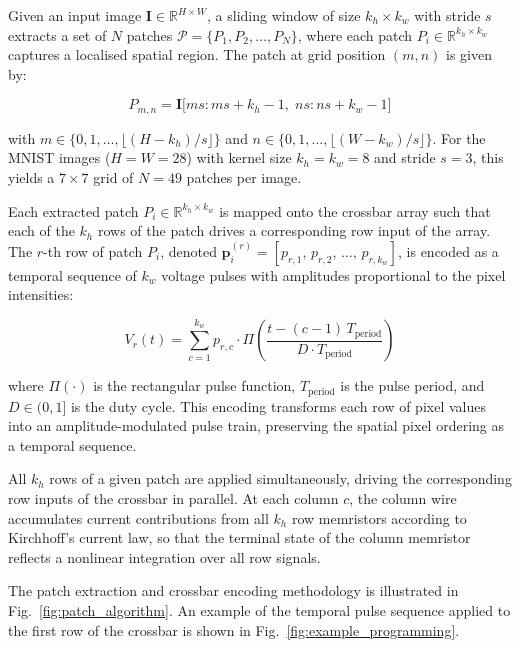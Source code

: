 \documentclass[11pt, oneside]{article}
\begin{document}
Given an input image \(\mathbf{I} \in \mathbb{R}^{H \times W}\), a sliding window of size \(k_h \times k_w\) with stride \(s\) extracts a set of \(N\) patches \(\mathcal{P} = \{P_1, P_2, \ldots, P_N\}\), where each patch \(P_i \in \mathbb{R}^{k_h \times k_w}\) captures a localised spatial region. The patch at grid position \((m, n)\) is given by:

\begin{equation}
    P_{m,n} = \mathbf{I}\bigl[m s : m s + k_h - 1,\; n s : n s + k_w - 1\bigr]
\end{equation}

\noindent with \(m \in \{0, 1, \ldots, \lfloor(H - k_h)/s\rfloor\}\) and \(n \in \{0, 1, \ldots, \lfloor(W - k_w)/s\rfloor\}\). For the MNIST images (\(H = W = 28\)) with kernel size \(k_h = k_w = 8\) and stride \(s = 3\), this yields a \(7 \times 7\) grid of \(N = 49\) patches per image.



Each extracted patch \(P_i \in \mathbb{R}^{k_h \times k_w}\) is mapped onto the crossbar array such that each of the \(k_h\) rows of the patch drives a corresponding row input of the array. The \(r\)-th row of patch \(P_i\), denoted \(\mathbf{p}_i^{(r)} = [p_{r,1},\, p_{r,2},\, \ldots,\, p_{r,k_w}]\), is encoded as a temporal sequence of \(k_w\) voltage pulses with amplitudes proportional to the pixel intensities:

\begin{equation}
    V_r(t) = \sum_{c=1}^{k_w} p_{r,c} \cdot \Pi\!\left(\frac{t - (c-1)\,T_{\mathrm{period}}}{D \cdot T_{\mathrm{period}}}\right)
\end{equation}

\noindent where \(\Pi(\cdot)\) is the rectangular pulse function, \(T_{\mathrm{period}}\) is the pulse period, and \(D \in (0, 1]\) is the duty cycle. This encoding transforms each row of pixel values into an amplitude-modulated pulse train, preserving the spatial pixel ordering as a temporal sequence.

All \(k_h\) rows of a given patch are applied simultaneously, driving the corresponding row inputs of the crossbar in parallel. At each column \(c\), the column wire accumulates current contributions from all \(k_h\) row memristors according to Kirchhoff's current law, so that the terminal state of the column memristor reflects a nonlinear integration over all row signals.

The patch extraction and crossbar encoding methodology is illustrated in Fig.~\ref{fig:patch_algorithm}. An example of the temporal pulse sequence applied to the first row of the crossbar is shown in Fig.~\ref{fig:example_programming}.
\end{document}
